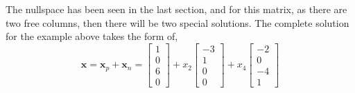             The nullspace has been seen in the last section, and for this matrix, as there are two free columns, then 
            there will be two special solutions. The complete solution for the example above takes the form of,
            \begin{equation}
                \boldsymbol{x} = \boldsymbol{x}_p + \boldsymbol{x}_n = 
                \begin{bmatrix}
                    1 \\ 0 \\ 6 \\ 0
                \end{bmatrix}
                + x_2
                \begin{bmatrix}
                    -3 \\ 1 \\ 0 \\ 0
                \end{bmatrix}
                + x_4
                \begin{bmatrix}
                    -2 \\ 0 \\ -4 \\ 1
                \end{bmatrix}
            \end{equation}
        
